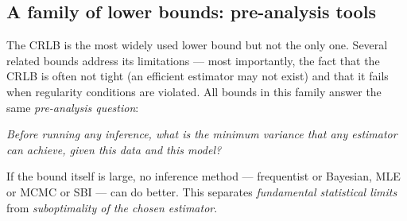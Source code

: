 \documentclass[11pt, a4paper]{article}
\begin{document}
\subsection*{A family of lower bounds: pre-analysis tools}
\label{sec:bounds_family}

The CRLB is the most widely used lower bound but not the only one.
Several related bounds address its limitations --- most importantly, the fact
that the CRLB is often not tight (an efficient estimator may not exist) and
that it fails when regularity conditions are violated.
All bounds in this family answer the same \emph{pre-analysis question}:

\begin{center}
\emph{Before running any inference, what is the minimum variance that any
estimator can achieve, given this data and this model?}
\end{center}

\noindent If the bound itself is large, no inference method --- frequentist or
Bayesian, MLE or MCMC or SBI --- can do better.
This separates \emph{fundamental statistical limits} from
\emph{suboptimality of the chosen estimator}.
\end{document}
